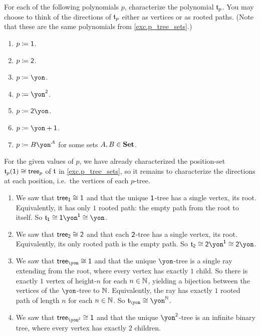 \documentclass[Book-Poly]{subfiles}
\begin{document}
\begin{exercise}\label{exc.p_tree_polys}
For each of the following polynomials $p$, characterize the polynomial $\mathfrak{t}_p$.
You may choose to think of the directions of $\mathfrak{t}_p$ either as vertices or as rooted paths.
(Note that these are the same polynomials from \cref{exc.p_tree_sets}.)
\begin{enumerate}
	\item \label{exc.p_tree_polys.1} $p\coloneqq\textsf{1}$.
	\item $p\coloneqq\textsf{2}$.
	\item \label{exc.p_tree_polys.unary} $p\coloneqq\yon$.
	\item \label{exc.p_tree_polys.binary} $p\coloneqq\yon^\2$.
	\item \label{exc.p_tree_polys.2_label_ray} $p\coloneqq{\2\yon}$.
	\item \label{exc.p_tree_polys.maybe_unary} $p\coloneqq{\yon+\1}$.
	\item \label{exc.p_tree_polys.monomial} $p\coloneqq{B\yon^A}$ for some sets $A,B\in\mathbf{Set}$.
\qedhere
\end{enumerate}
\begin{solution}
For the given values of $p$, we have already characterized the position-set $\mathfrak{t}_p(\textsf{1})\cong\mathsf{tree}_p$ of $\mathfrak{t}$ in \cref{exc.p_tree_sets}, so it remains to characterize the directions at each position, i.e.\ the vertices of each $p$-tree.
\begin{enumerate}
    \item We saw that $\mathsf{tree}_{\textsf{1}}\cong\textsf{1}$ and that the unique $\textsf{1}$-tree has a single vertex, its root.
    Equivalently, it has only $1$ rooted path: the empty path from the root to itself.
    So $\ema{t}_\1\iso\1\yon^\1\iso\yon$.
    \item We saw that $\mathsf{tree}_{\textsf{2}}\cong\textsf{2}$ and that each $\textsf{2}$-tree has a single vertex, its root.
    Equivalently, its only rooted path is the empty path.
    So $\ema{t}_\2\iso\2\yon^\1\iso\2\yon$.
    \item We saw that $\tr_\yon\iso\1$ and that the unique $\yon$-tree is a single ray extending from the root, where every vertex has exactly $1$ child.
    So there is exactly $1$ vertex of height-$n$ for each $n\in\mathbb{N}$, yielding a bijection between the vertices of the $\yon$-tree to $\mathbb{N}$.
    Equivalently, the ray has exactly $1$ rooted path of length $n$ for each $n\in\mathbb{N}$.
    So $\ema{t}_\yon\iso\yon^\nn$.
    \item We saw that $\tr_{\yon^\2}\iso\1$ and that the unique $\yon^\2$-tree is an infinite binary tree, where every vertex has exactly $2$ children.

\end{enumerate}
\end{solution}
\end{exercise}
\end{document}
